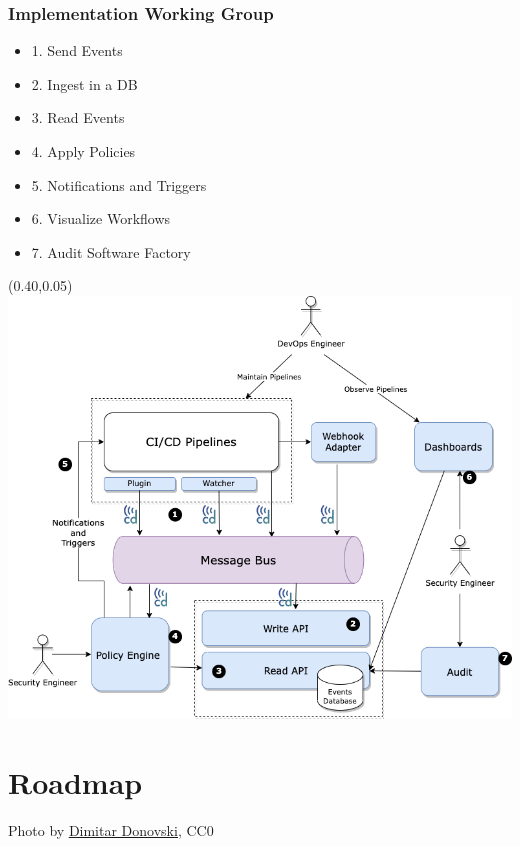 \documentclass[aspectratio=169,11pt,hyperref={colorlinks=true}]{beamer}
\begin{document}
\begin{grayframe}
  \frametitle{Implementation Working Group}
  \begin{itemize}
    \item 1. Send Events
    \item 2. Ingest in a DB
    \item 3. Read Events
    \item 4. Apply Policies
    \item 5. Notifications and Triggers
    \item 6. Visualize Workflows
    \item 7. Audit Software Factory
  \end{itemize}
  \begin{textblock*}{0.56\paperwidth}(0.40\paperwidth,0.05\paperheight)
    \includegraphics[width=0.56\paperwidth]{img/cdevents-implementation-wg.png}
  \end{textblock*}
\end{grayframe}

\section{Roadmap}
\begin{sectionwithpiclargecentral}{Photo by \href{https://unsplash.com/@dmtrdon}{\underline{Dimitar Donovski}}, CC0}
\end{sectionwithpiclargecentral}
\end{document}
